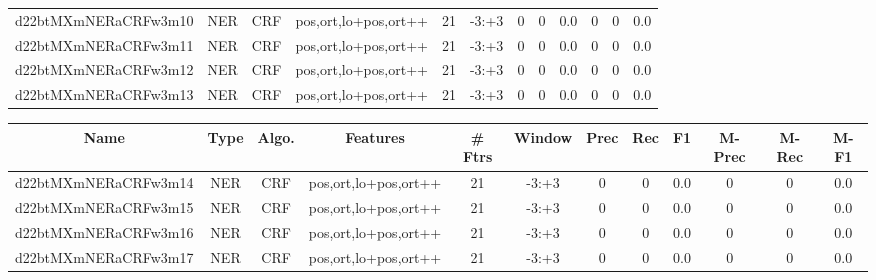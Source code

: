 \documentclass[a4paper]{article}
\begin{document}
\begin{landscape}
\begin{center}
\begin{tabular}{ |c|c|c|c|c|c|c|c|c|c|c|c|}
 
 	
 	\small{ d22btMXmNERaCRFw3m10 } & \small{ NER} & \small{  CRF }  & pos,ort,lo+pos,ort++  &  21 &  \small{  -3:+3 }  &  0 & 0 & 0.0  &  0 & 0 & 0.0 \\
 	

 
 	
 	\small{ d22btMXmNERaCRFw3m11 } & \small{ NER} & \small{  CRF }  & pos,ort,lo+pos,ort++  &  21 &  \small{  -3:+3 }  &  0 & 0 & 0.0  &  0 & 0 & 0.0 \\
 	

 
 	
 	\small{ d22btMXmNERaCRFw3m12 } & \small{ NER} & \small{  CRF }  & pos,ort,lo+pos,ort++  &  21 &  \small{  -3:+3 }  &  0 & 0 & 0.0  &  0 & 0 & 0.0 \\
 	

 
 	
 	\small{ d22btMXmNERaCRFw3m13 } & \small{ NER} & \small{  CRF }  & pos,ort,lo+pos,ort++  &  21 &  \small{  -3:+3 }  &  0 & 0 & 0.0  &  0 & 0 & 0.0 \\
 	
 \hline
\end{tabular}
\end{center}




\begin{center}
\begin{tabular}{ |c|c|c|c|c|c|c|c|c|c|c|c|} 
 \hline
 	Name & Type & Algo. & Features & \# Ftrs & Window & Prec & Rec & F1 & M-Prec & M-Rec & M-F1\\
 \hline

 	

 
 	
 	\small{ d22btMXmNERaCRFw3m14 } & \small{ NER} & \small{  CRF }  & pos,ort,lo+pos,ort++  &  21 &  \small{  -3:+3 }  &  0 & 0 & 0.0  &  0 & 0 & 0.0 \\
 	

 
 	
 	\small{ d22btMXmNERaCRFw3m15 } & \small{ NER} & \small{  CRF }  & pos,ort,lo+pos,ort++  &  21 &  \small{  -3:+3 }  &  0 & 0 & 0.0  &  0 & 0 & 0.0 \\
 	

 
 	
 	\small{ d22btMXmNERaCRFw3m16 } & \small{ NER} & \small{  CRF }  & pos,ort,lo+pos,ort++  &  21 &  \small{  -3:+3 }  &  0 & 0 & 0.0  &  0 & 0 & 0.0 \\
 	

 
 	
 	\small{ d22btMXmNERaCRFw3m17 } & \small{ NER} & \small{  CRF }  & pos,ort,lo+pos,ort++  &  21 &  \small{  -3:+3 }  &  0 & 0 & 0.0  &  0 & 0 & 0.0 \\
 	


\end{tabular}
\end{center}
\end{landscape}
\end{document}
